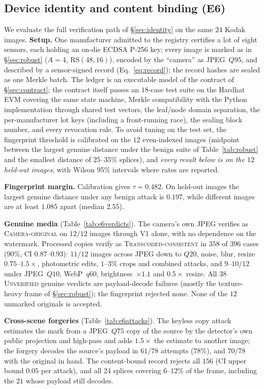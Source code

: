 \documentclass[journal]{IEEEtran}
\begin{document}
\fi
\subsection{Device identity and content binding (E6)}\label{sec:e6}
We evaluate the full verification path of \S\ref{sec:identity} on the same $24$
Kodak images. \textbf{Setup.} One manufacturer admitted to the registry
certifies a lot of eight sensors, each holding an on-die ECDSA P-256 key; every
image is marked as in \S\ref{sec:robust} ($A\!=\!4$, RS$(48,16)$), encoded by the
``camera'' as JPEG~$Q95$, and described by a sensor-signed record
(Eq.~\ref{eq:record}); the record hashes are sealed as one Merkle batch. The
ledger is an executable model of the contract of \S\ref{sec:contract}; the
contract itself passes an $18$-case test suite on the Hardhat EVM covering the
same state machine, Merkle compatibility with the Python implementation through
shared test vectors, the leaf/node domain separation, the per-manufacturer lot
keys (including a front-running race), the sealing block number, and every
revocation rule. To avoid tuning on the test set, the fingerprint threshold is
calibrated on the $12$ even-indexed images (midpoint between the largest genuine
distance under the benign suite of Table~\ref{tab:robust} and the smallest
distance of $25$--$35\%$ splices), and \emph{every result below is on the $12$
held-out images}, with Wilson $95\%$ intervals where rates are reported.

\textbf{Fingerprint margin.} Calibration gives $\tau=0.482$. On held-out images
the largest genuine distance under any benign attack is $0.197$, while different
images are at least $1.085$ apart (median $2.55$).

\textbf{Genuine media} (Table~\ref{tab:e6verdicts}). The camera's own JPEG
verifies as \textsc{Camera-original} on $12/12$ images through V1 alone, with no
dependence on the watermark. Processed copies verify as
\textsc{Transcoded-consistent} in $358$ of $396$ cases ($90\%$, CI $0.87$--$0.93$):
$11/12$ images across JPEG down to $Q20$, noise, blur, resize $0.75$--$1.5\times$,
photometric edits, $1$--$3\%$ crops and combined attacks, and $9$--$10/12$ under
JPEG~$Q10$, WebP~$q60$, brightness~$\times1.1$ and $0.5\times$ resize. All $38$
\textsc{Unverified} genuine verdicts are payload-decode failures (mostly the
texture-heavy frame of \S\ref{sec:robust}); the fingerprint rejected none. None of
the $12$ unmarked originals is accepted.

\textbf{Cross-scene forgeries} (Table~\ref{tab:e6attacks}). The keyless copy
attack estimates the mark from a JPEG~$Q75$ copy of the source by the detector's
own public projection and high-pass and adds $1.5\times$ the estimate to another
image; the forgery decodes the source's payload in $61/78$ attempts ($78\%$), and
$70/78$ with the original in hand. The content-bound record rejects all $156$
(CI upper bound $0.05$ per attack), and all $24$ splices covering $6$--$12\%$ of
the frame, including the $21$ whose payload still decodes.
\end{document}
